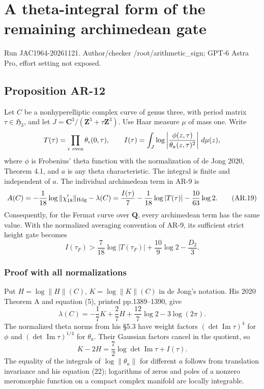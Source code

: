 \section{A theta-integral form of the remaining archimedean
gate}\label{a-theta-integral-form-of-the-remaining-archimedean-gate}

Run JAC1964-20261121. Author/checker /root/arithmetic\_sign; GPT-6 Astra
Pro, effort setting not exposed.

\subsection{Proposition AR-12}\label{proposition-ar-12}

Let \(C\) be a nonhyperelliptic complex curve of genus three, with
period matrix \(\tau\in\mathfrak H_3\), and let
\(J=\mathbf C^3/(\mathbf Z^3+\tau\mathbf Z^3)\). Use Haar measure
\(\mu\) of mass one. Write \[
T(\tau)=\prod_{\epsilon\ {\rm even}}\theta_\epsilon(0,\tau),
\qquad
I(\tau)=\int_J\log\left|
  \frac{\phi(z,\tau)}{\theta_a(z,\tau)^2}
\right|\,d\mu(z),
\] where \(\phi\) is Frobenius' theta function with the normalization of
de Jong 2020, Theorem 4.1, and \(a\) is any theta characteristic. The
integral is finite and independent of \(a\). The individual archimedean
term in AR-9 is \[
A(C)=-\frac1{18}\log\|\chi'_{18}\|_{\rm Hdg}-\lambda(C)
     =\frac{I(\tau)}7-\frac1{18}\log|T(\tau)|
        -\frac{10}{63}\log2.
\tag{AR.19}
\] Consequently, for the Fermat curve over \(\mathbf Q\), every
archimedean term has the same value. With the normalized averaging
convention of AR-9, its sufficient strict height gate becomes \[
I(\tau_F)>
\frac7{18}\log|T(\tau_F)|+\frac{10}{9}\log2-\frac{D_2}{3}.
\tag{AR.20}
\]

\subsubsection{Proof with all
normalizations}\label{proof-with-all-normalizations}

Put \(H=\log\|H\|(C)\), \(K=\log\|K\|(C)\) in de Jong's notation. His
2020 Theorem A and equation (5), printed pp.1389--1390, give \[
\lambda(C)=-\frac17K+\frac27H
                +\frac{12}{7}\log2-3\log(2\pi).
\] The normalized theta norms from his §5.3 have weight factors
\((\det\operatorname{Im}\tau)^4\) for \(\phi\) and
\((\det\operatorname{Im}\tau)^{1/4}\) for \(\theta_a\). Their Gaussian
factors cancel in the quotient, so \[
K-2H=\frac72\log\det\operatorname{Im}\tau+I(\tau).
\] The equality of the integrals of \(\log\|\theta_a\|\) for different
\(a\) follows from translation invariance and his equation (22);
logarithms of zeros and poles of a nonzero meromorphic function on a
compact complex manifold are locally integrable.

